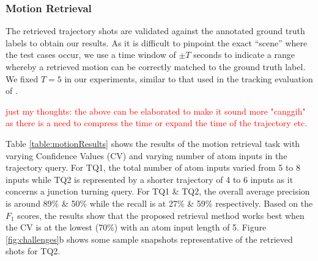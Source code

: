 \documentclass[runningheads]{llncs}
\newcommand\tab[1][1cm]{\hspace*{#1}}
\newcommand{\ian}[1]{\textcolor{red}{#1}}
\newcommand{\ian}[1]{}   %
\begin{document}

\subsubsection{Motion Retrieval} \tab

The retrieved trajectory shots are validated against the annotated ground truth labels to obtain our results. As it is difficult to pinpoint the exact ``scene'' where the test cases occur, we use a time window of $\pm T$ seconds to indicate a range whereby a retrieved motion can be correctly matched to the ground truth label. We fixed $T=5$ in our experiments, similar to that used in the tracking evaluation of \cite{lim2017}. 

\ian{just my thoughts: the above can be elaborated to make it sound more "canggih" as there is a need to compress the time or expand the time of the trajectory etc.}

Table \ref{table:motionResults} shows the results of the motion retrieval task with varying Confidence Values (CV) and varying number of atom inputs in the trajectory query. For TQ1, the total number of atom inputs varied from 5 to 8 inputs while TQ2 is represented by a shorter trajectory of 4 to 6 inputs as it concerns a junction turning query. For TQ1 \& TQ2, the overall average precision is around 89\% \& 50\% while the recall is at 27\% \& 59\% respectively.  Based on the $F_1$ scores, the results show that the proposed retrieval method works best when the CV is at the lowest (70\%) with an atom input length of 5. Figure \ref{fig:challenges}b shows some sample snapshots representative of the retrieved shots for TQ2.
\end{document}
